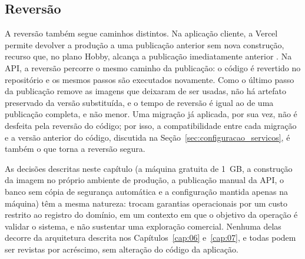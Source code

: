 \subsection{Reversão}

A reversão também segue caminhos distintos. Na aplicação cliente, a Vercel permite devolver a produção a uma publicação anterior sem nova construção, recurso que, no plano Hobby, alcança a publicação imediatamente anterior \cite{vercel2026rollback}. Na API, a reversão percorre o mesmo caminho da publicação: o código é revertido no repositório e os mesmos passos são executados novamente. Como o último passo da publicação remove as imagens que deixaram de ser usadas, não há artefato preservado da versão substituída, e o tempo de reversão é igual ao de uma publicação completa, e não menor. Uma migração já aplicada, por sua vez, não é desfeita pela reversão do código; por isso, a compatibilidade entre cada migração e a versão anterior do código, discutida na Seção~\ref{sec:configuracao_servicos}, é também o que torna a reversão segura.

As decisões descritas neste capítulo (a máquina gratuita de 1~GB, a construção da imagem no próprio ambiente de produção, a publicação manual da API, o banco sem cópia de segurança automática e a configuração mantida apenas na máquina) têm a mesma natureza: trocam garantias operacionais por um custo restrito ao registro do domínio, em um contexto em que o objetivo da operação é validar o sistema, e não sustentar uma exploração comercial. Nenhuma delas decorre da arquitetura descrita nos Capítulos~\ref{cap:06} e~\ref{cap:07}, e todas podem ser revistas por acréscimo, sem alteração do código da aplicação.
